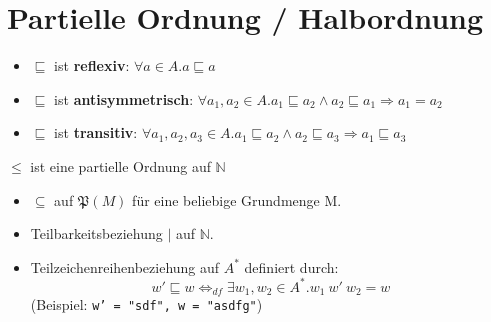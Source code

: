 \documentclass{article}
\begin{document}
\large
\section*{Partielle Ordnung / Halbordnung}
\begin{defBox}[5.1]
	\begin{itemize}[label=]
		\item $\sqsubseteq$ ist \textbf{reflexiv}: {\color{colCornYellow} $\forall a \in A. a \sqsubseteq a$}
		\item $\sqsubseteq$ ist \textbf{antisymmetrisch}: {\color{colCornYellow} $\forall a_1, a_2 \in A. a_1 \sqsubseteq a_2 \land a_2 \sqsubseteq a_1 \Rightarrow a_1 = a_2$}
		\item $\sqsubseteq$ ist \textbf{transitiv}: {\color{colCornYellow} $\forall a_1, a_2, a_3 \in A. a_1 \sqsubseteq a_2 \land a_2 \sqsubseteq a_3 \Rightarrow a_1 \sqsubseteq a_3$}
	\end{itemize}
\end{defBox}
\begin{senBox}[5.1]
	\begin{center}
		$\leq$ ist eine partielle Ordnung auf $\mathbb{N}$
	\end{center}
\end{senBox}
\begin{exampleBox}
	\begin{itemize}[label=]
		\item $\subseteq$ auf $\mathfrak{P}(M)$ für eine beliebige Grundmenge M.
		\item Teilbarkeitsbeziehung $|$ auf $\mathbb{N}$.
		\item Teilzeichenreihenbeziehung auf $A^{*}$ definiert durch:
		      \[
			      w' \sqsubseteq w \Leftrightarrow_{df} \exists w_1, w_2 \in A^{*}. w_1\ w'\ w_2 = w
		      \]
		      (Beispiel: \texttt{w' = "sdf", w = "asdfg"})
	\end{itemize}
\end{exampleBox}
\end{document}
